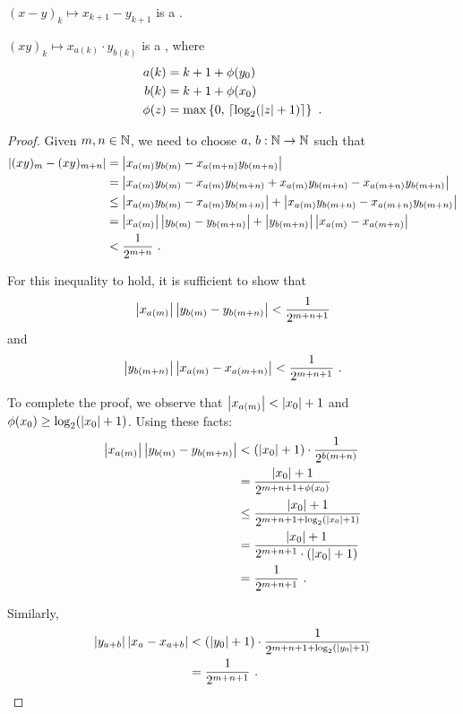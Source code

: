 \documentclass[leqno]{report}
\begin{document}
\begin{Corollary}[Subtraction]
    $(x-y)_k \mapsto x_{k+1} - y_{k+1}$ is a \FCCS.
\end{Corollary}

\begin{Proposition}[Multiplication]
    $(xy)_k \mapsto x_{a(k)} \cdot y_{b(k)}$ is a \FCCS, where
    \begin{align*}
        a(k) &= k + 1 + \phi(y_0) \\
        b(k) &= k + 1 + \phi(x_0) \\
        \phi(z) &= \max \left\{  0,\, \left\lceil \log_2(\left| z \right| + 1) \right\rceil  \right\}
        \ .
    \end{align*}
\end{Proposition}

\begin{proof}
    Given $m, n \in \mathbb{N}$, we need to choose $a,\, b : \mathbb{N} \rightarrow \mathbb{N}$ such that
    \begin{align*}
        \left| (xy)_m - (xy)_{m+n} \right|
        &= \left| x_{a(m)} y_{b(m)} - x_{a(m+n)} y_{b(m+n)} \right| \\
        &= \left| x_{a(m)} y_{b(m)} - x_{a(m)} y_{b(m+n)} + x_{a(m)} y_{b(m+n)} - x_{a(m+n)} y_{b(m+n)} \right| \\
        &\leq \left| x_{a(m)} y_{b(m)} - x_{a(m)} y_{b(m+n)} \right| + \left| x_{a(m)} y_{b(m+n)} - x_{a(m+n)} y_{b(m+n)} \right| \\
        &= \left| x_{a(m)} \right|\left| y_{b(m)} - y_{b(m+n)} \right| + \left| y_{b(m+n)} \right|\left| x_{a(m)} - x_{a(m+n)} \right| \\
        &< \frac{1}{2^{m+n}}
        \ .
    \end{align*}

    For this inequality to hold, it is sufficient to show that
    \[ \left| x_{a(m)} \right|\left| y_{b(m)} - y_{b(m+n)} \right| < \frac{1}{2^{m+n+1}} \]
    and
    \[ \left| y_{b(m+n)} \right|\left| x_{a(m)} - x_{a(m+n)} \right| < \frac{1}{2^{m+n+1}} \ . \]

    To complete the proof, we observe that $\left| x_{a(m)} \right| < \left| x_0 \right| + 1$ and $\phi(x_0) \geq \log_2(\left| x_0 \right| + 1)$. Using these facts:
    \begin{align*}
        \left| x_{a(m)} \right|\left| y_{b(m)} - y_{b(m+n)} \right|
        &< (\left| x_0 \right| + 1) \cdot \frac{1}{2^{b(m+n)}} \\
        &= \frac{\left| x_0 \right| + 1}{2^{m + n + 1 + \phi(x_0)}} \\
        &\leq \frac{\left| x_0 \right| + 1}{2^{m + n + 1 + \log_2(\left| x_0 \right| + 1)}} \\
        &= \frac{\left| x_0 \right| + 1}{2^{m + n + 1} \cdot (\left| x_0 \right| + 1)} \\
        &= \frac{1}{2^{m + n + 1}}
        \ .
    \end{align*}

    Similarly,
    \begin{align*}
        \left| y_{a+b} \right|\left| x_a - x_{a+b} \right|
        &< (\left| y_0 \right| + 1) \cdot \frac{1}{2^{m + n + 1 + \log_2(\left| y_0 \right| + 1)}} \\
        &= \frac{1}{2^{m + n + 1}}
        \ . \qedhere
    \end{align*}
\end{proof}
\end{document}
